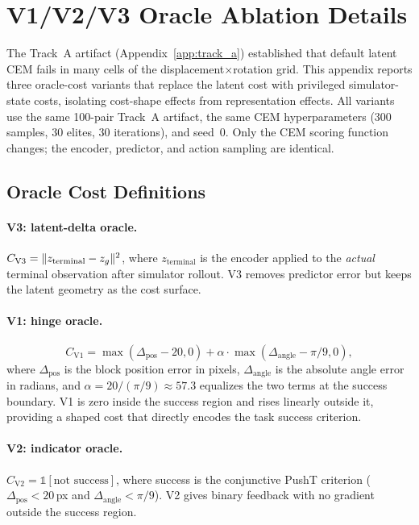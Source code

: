 \section{V1/V2/V3 Oracle Ablation Details}
\label{app:oracle}

The Track~A artifact (Appendix~\ref{app:track_a}) established that default
latent CEM fails in many cells of the displacement$\times$rotation grid.
This appendix reports three oracle-cost variants that replace the latent
cost with privileged simulator-state costs, isolating cost-shape effects from
representation effects.  All variants use the same 100-pair Track~A artifact,
the same CEM hyperparameters (300 samples, 30 elites, 30 iterations), and
seed~0.  Only the CEM scoring function changes; the encoder, predictor, and
action sampling are identical.

\subsection{Oracle Cost Definitions}

\paragraph{V3: latent-delta oracle.}
$C_\text{V3} = \|z_\text{terminal} - z_g\|^2$, where $z_\text{terminal}$
is the encoder applied to the \emph{actual} terminal observation after
simulator rollout.  V3 removes predictor error but keeps the
latent geometry as the cost surface.

\paragraph{V1: hinge oracle.}
\begin{equation}
C_\text{V1} = \max(\Delta_\text{pos} - 20, 0) + \alpha \cdot \max(\Delta_\text{angle} - \pi/9, 0),
\label{eq:v1}
\end{equation}
where $\Delta_\text{pos}$ is the block position error in pixels,
$\Delta_\text{angle}$ is the absolute angle error in radians, and
$\alpha = 20 / (\pi/9) \approx 57.3$ equalizes the two terms at the success
boundary.  V1 is zero inside the success region and rises linearly outside
it, providing a shaped cost that directly encodes the task success criterion.

\paragraph{V2: indicator oracle.}
$C_\text{V2} = \mathbb{1}[\text{not success}]$, where success is the
conjunctive PushT criterion ($\Delta_\text{pos} < 20$\,px and
$\Delta_\text{angle} < \pi/9$).  V2 gives binary feedback with no gradient
outside the success region.

